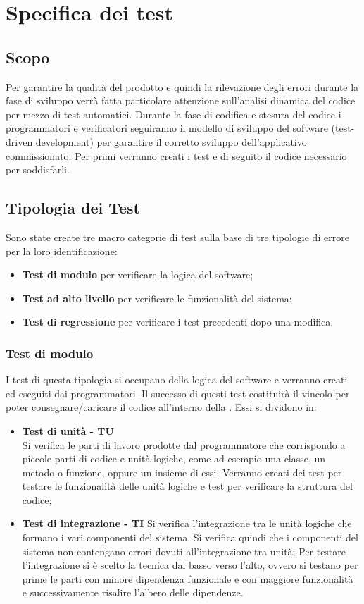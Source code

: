 \clearpage
\section{Specifica dei test}
\subsection{Scopo}
Per garantire la qualità del prodotto e quindi la rilevazione degli errori durante la fase di sviluppo verrà fatta particolare attenzione sull'analisi dinamica del codice per mezzo di test automatici.
Durante la fase di codifica e stesura del codice i programmatori e verificatori seguiranno il modello di sviluppo del software  (test-driven development) per garantire il corretto sviluppo dell'applicativo commissionato.
Per primi verranno creati i test e di seguito il codice necessario per soddisfarli.
\subsection{Tipologia dei Test}
Sono state create tre macro categorie di test sulla base di tre tipologie di errore per la loro identificazione:
\begin{itemize}
	\item \textbf{Test di modulo} per verificare la logica del software;
	\item \textbf{Test ad alto livello} per verificare le funzionalità del sistema;
	\item \textbf{Test di regressione} per verificare i test precedenti dopo una modifica.
\end{itemize} 
\subsubsection{Test di modulo}
I test di questa tipologia si occupano della  logica del software e verranno creati ed eseguiti dai programmatori. Il successo di questi test costituirà il vincolo per poter consegnare/caricare il codice all'interno della .
Essi si dividono in:
\begin{itemize}
	\item \textbf{Test di unità - TU}\\
	Si verifica le parti di lavoro prodotte dal programmatore che corrispondo a piccole parti di codice e unità logiche, come ad esempio una classe, un metodo o funzione, oppure un insieme di essi.
	Verranno creati dei test  per testare le funzionalità delle unità logiche e test  per verificare la struttura del codice;
	\item \textbf{Test di integrazione - TI}
	Si verifica l'integrazione tra le unità logiche che formano i vari componenti del sistema. Si verifica quindi che i componenti del sistema non contengano errori dovuti all'integrazione tra unità;
	Per testare l'integrazione si è scelto la tecnica dal basso verso l'alto, ovvero si testano per prime le parti con minore dipendenza funzionale e con maggiore funzionalità e successivamente risalire l'albero delle dipendenze.	
\end{itemize} 
